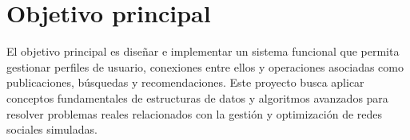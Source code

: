 \section{Objetivo principal}
El objetivo principal es diseñar e implementar un sistema funcional que permita gestionar perfiles de usuario, conexiones entre ellos y operaciones asociadas como publicaciones, búsquedas y recomendaciones. Este proyecto busca aplicar conceptos fundamentales de estructuras de datos y algoritmos avanzados para resolver problemas reales relacionados con la gestión y optimización de redes sociales simuladas.